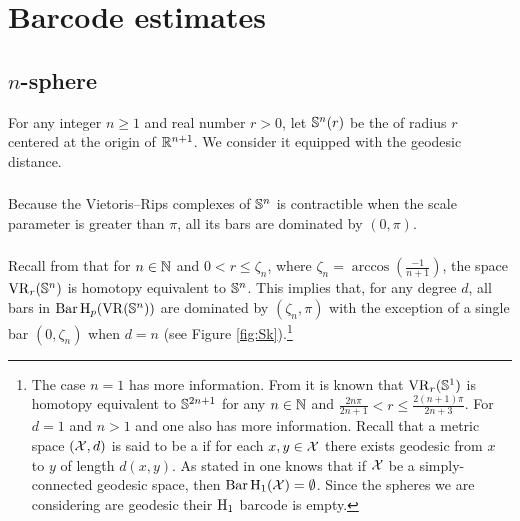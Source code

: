 
\section{Barcode estimates}\label{s:computations}

\subsection{$n$-sphere}\label{ss:Sn}

For any integer $n \geq 1$ and real number $r > 0$, let $\mathbb{S}^n(r)$ be the  of radius $r$ centered at the origin of $\mathbb{R}^{n+1}$.
We consider it equipped with the geodesic distance.

\subsubsection{}

Because the Vietoris--Rips complexes of $\mathbb{S}^n$ is contractible when the scale parameter is greater than $\pi$, all its bars are dominated by $(0, \pi)$.

\subsubsection{} 

Recall from \cite[Thm.~10]{lim2020vietoris} that for $n \in \mathbb{N}$ and  $0 < r \leq \zeta_n$, where $\zeta_n = \arccos(\tfrac{-1}{n+1})$, the space $\operatorname{VR}_r(\mathbb{S}^n)$ is homotopy equivalent to $\mathbb{S}^n$.
This implies that, for any degree $d$, all bars in $\operatorname{Bar}\mathrm{H}_p (\operatorname{VR}(\mathbb{S}^n))$ are dominated by $(\zeta_n,\pi)$ with the exception of a single bar $(0,\zeta_n)$ when $d = n$ (see Figure \ref{fig:Sk}).\footnote{
	The case $n = 1$ has more information.
	From \cite[Thm.~7.4]{adamaszek2017vietoris} it is known that $\operatorname{VR}_r(\mathbb{S}^1)$ is homotopy equivalent to $\mathbb{S}^{2n+1}$ for any $n \in \mathbb{N}$ and $\frac{2n\pi}{2n+1} < r \leq \frac{2(n+1)\pi}{2n+3}$.
	For $d=1$ and $n > 1$ and one also has more information.
	Recall that a metric space $(\mathcal{X}, d)$ is said to be a  if for each $x, y \in \mathcal{X}$ there exists geodesic from $x$ to $y$ of length $d(x, y)$.
	As stated in \cite[Prop.~7.10]{virk20201} one knows that if $\mathcal{X}$ be a simply-connected geodesic space, then $\operatorname{Bar}\mathrm{H}_1(\mathcal{X}) = \emptyset$.
	Since the spheres we are considering are geodesic their $\mathrm{H}_1$ barcode is empty. }

